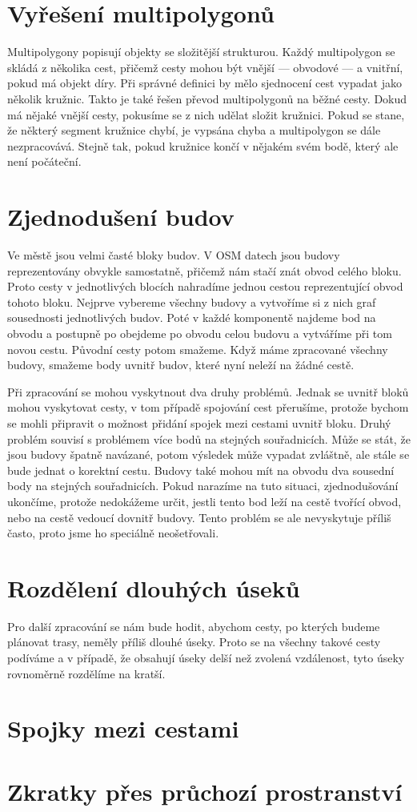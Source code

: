 \section{Vyřešení multipolygonů}
Multipolygony popisují objekty se složitější strukturou. Každý multipolygon se
skládá z několika cest, přičemž cesty mohou být vnější --- obvodové --- a
vnitřní, pokud má objekt díry. Při správné definici by mělo sjednocení cest
vypadat jako několik kružnic. Takto je také řešen převod multipolygonů na běžné
cesty. Dokud má nějaké vnější cesty, pokusíme se z nich udělat složit kružnici.
Pokud se stane, že některý segment kružnice chybí, je vypsána chyba a
multipolygon se dále nezpracovává. Stejně tak, pokud kružnice končí v nějakém
svém bodě, který ale není počáteční. 

\section{Zjednodušení budov}
Ve městě jsou velmi časté bloky budov. V OSM datech jsou budovy reprezentovány
obvykle samostatně, přičemž nám stačí znát obvod celého bloku. Proto cesty v
jednotlivých blocích nahradíme jednou cestou reprezentující obvod tohoto bloku.
Nejprve vybereme všechny budovy a vytvoříme si z nich graf sousednosti
jednotlivých budov. Poté v každé komponentě najdeme bod na obvodu a postupně
po obejdeme po obvodu celou budovu a vytváříme při tom novou cestu. Původní
cesty potom smažeme. Když máme zpracované všechny budovy, smažeme body uvnitř
budov, které nyní neleží na žádné cestě.

Při zpracování se mohou vyskytnout dva druhy problémů. Jednak se uvnitř bloků
mohou vyskytovat cesty, v tom případě spojování cest přerušíme, protože bychom
se mohli připravit o možnost přidání spojek mezi cestami uvnitř bloku. Druhý
problém souvisí s problémem více bodů na stejných souřadnicích. Může se stát, že
jsou budovy špatně navázané, potom výsledek může vypadat zvláštně, ale stále se
bude jednat o korektní cestu. Budovy také mohou mít na obvodu dva sousední body
na stejných souřadnicích. Pokud narazíme na tuto situaci, zjednodušování
ukončíme, protože nedokážeme určit, jestli tento bod leží na cestě tvořící
obvod, nebo na cestě vedoucí dovnitř budovy. Tento problém se ale nevyskytuje
příliš často, proto jsme ho speciálně neošetřovali.

\section{Rozdělení dlouhých úseků}
Pro další zpracování se nám bude hodit, abychom cesty, po kterých budeme
plánovat trasy, neměly příliš dlouhé úseky. Proto se na všechny takové cesty
podíváme a v případě, že obsahují úseky delší než zvolená vzdálenost, tyto úseky
rovnoměrně rozdělíme na kratší. 

\section{Spojky mezi cestami}

\section{Zkratky přes průchozí prostranství}
